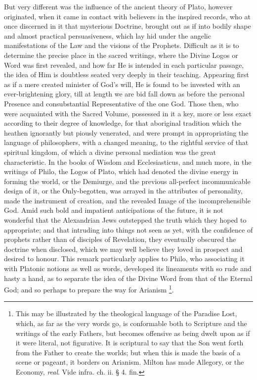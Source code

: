 But very different was the influence of the ancient theory of
Plato, however originated, when it came in contact with believers
in the inspired records, who at once discerned in it that mysterious
Doctrine, brought out as if into bodily shape and almost practical
persuasiveness, which lay hid under the angelic manifestations of the
Law and the visions of the Prophets. Difficult as it is to determine
the precise place in the sacred writings, where the Divine Logos or
Word was first revealed, and how far He is intended in each particular
passage, the idea of Him is doubtless seated very deeply in their
teaching. Appearing first as if a mere created minister of God's will,
He is found to be invested with an ever-brightening glory, till at
length we are bid fall down as before the personal Presence and
consubstantial Representative of the one God. Those then, who were
acquainted with the Sacred Volume, possessed in it a key, more or less
exact according to their degree of knowledge, for that aboriginal
tradition which the heathen ignorantly but piously venerated, and were
prompt in appropriating the language of philosophers, with a changed
meaning, to the rightful service of that spiritual kingdom, of which a
divine personal mediation was the great characteristic. In the books
of Wisdom and Ecclesiasticus, and much more, in the writings of Philo,
the Logos of Plato, which had denoted the divine energy in forming the
world, or the Demiurge, and the previous all-perfect incommunicable
design of it, or the Only-begotten, was arrayed in the attributes of
personality, made the instrument of creation, and the revealed Image
of the incomprehensible God. Amid such bold and impatient
anticipations of the future, it is not wonderful that the Alexandrian
Jews outstepped the truth which they hoped to appropriate; and that
intruding into things not seen as yet, with the confidence of
prophets rather than of disciples of Revelation, they eventually
obscured the doctrine when disclosed, which we may well believe they
loved in prospect and desired to honour. This remark particularly
applies to Philo, who associating it with Platonic notions as well as
words, developed its lineaments with so rude and hasty a hand, as to
separate the idea of the Divine Word from that of the Eternal God; and
so perhaps to prepare the way for Arianism \footnote{This may be illustrated by the theological
language of the Paradise Lost, which, as far as the very words go, is
conformable both to Scripture and the writings of the early Fathers,
but becomes offensive as being dwelt upon as if it were literal, not
figurative. It is scriptural to say that the Son went forth from the
Father to create the worlds; but when this is made the basis of a
scene or pageant, it borders on Arianism. Milton has made Allegory, or
the Economy, \emph{real}. Vide infra. ch. ii. § 4. fin.}.

